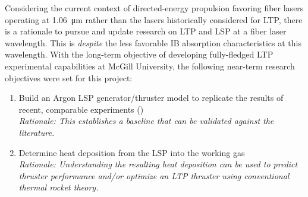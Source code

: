         Considering the current context of directed-energy propulsion favoring fiber lasers operating at \qty{1.06}{\um} rather than the  lasers historically considered for LTP, there is a rationale to pursue and update research on LTP and LSP at a fiber laser wavelength. This is \emph{despite} the less favorable IB absorption characteristics at this wavelength. With the long-term objective of developing fully-fledged LTP experimental capabilities at McGill University, the following near-term research objectives were set for this project:
        \begin{enumerate}
            \item Build an Argon LSP generator/thruster model to replicate the results of recent, comparable experiments (\cite{matsuiGeneratingConditionsArgon2019,zimakovInteractionNearIRLaser2016,luCharacteristicDiagnosticsLaserStabilized2022}) \\
                \textit{Rationale: This establishes a baseline that can be validated against the literature.}
            \item Determine heat deposition from the LSP into the working gas \\
                \textit{Rationale: Understanding the resulting heat deposition can be used to predict thruster performance and/or optimize an LTP thruster using conventional thermal rocket theory.}
        \end{enumerate}